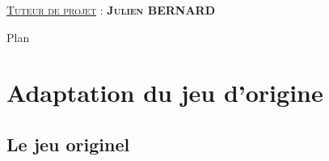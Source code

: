 \documentclass[french]{beamer}
\begin{document}
\begin{frame}
	\vspace{-0.20cm}
	

	\vspace{0.20cm}

	\textsc{\underline{Tuteur de projet} : \textbf{Julien BERNARD}}

\hspace{2cm}

\end{frame}

\begin{frame}{Plan}

	\tableofcontents

\end{frame}


\section{Adaptation du jeu d'origine}
	\subsection{Le jeu originel}
\end{document}
